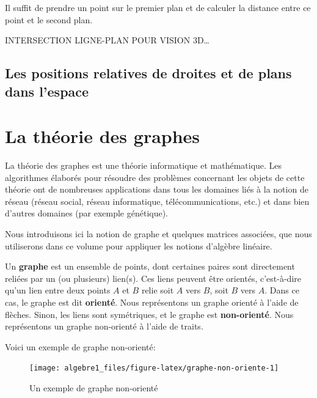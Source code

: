 \documentclass[]{book}
\theoremstyle{definition}
\theoremstyle{definition}
\theoremstyle{definition}
\theoremstyle{remark}
\let\BeginKnitrBlock\begin \let\EndKnitrBlock\end
\begin{document}
Il suffit de prendre un point sur le premier plan et de calculer la distance entre ce point et le second plan.

\BeginKnitrBlock{example}
\protect\hypertarget{exm:unnamed-chunk-237}{}{\label{exm:unnamed-chunk-237} }INTERSECTION LIGNE-PLAN POUR VISION 3D\ldots{}
\EndKnitrBlock{example}

\hypertarget{les-positions-relatives-de-droites-et-de-plans-dans-lespace}{%
\section{Les positions relatives de droites et de plans dans l'espace}\label{les-positions-relatives-de-droites-et-de-plans-dans-lespace}}

\hypertarget{appendix-appendices}{%
\appendix {}}


\hypertarget{graphes}{%
\chapter{La théorie des graphes}\label{graphes}}

La théorie des graphes est une théorie informatique et mathématique. Les algorithmes élaborés pour résoudre des problèmes concernant les objets de cette théorie ont de nombreuses applications dans tous les domaines liés à la notion de réseau (réseau social, réseau informatique, télécommunications, etc.) et dans bien d'autres domaines (par exemple génétique).

Nous introduisons ici la notion de graphe et quelques matrices associées, que nous utiliserons dans ce volume pour appliquer les notions d'algèbre linéaire.

\BeginKnitrBlock{definition}[Un graphe]
\protect\hypertarget{def:unnamed-chunk-238}{}{\label{def:unnamed-chunk-238} {} }Un \textbf{graphe} est un ensemble de points, dont certaines paires sont directement reliées par un (ou plusieurs) lien(s). Ces liens peuvent être orientés, c'est-à-dire qu'un lien entre deux points \(A\) et \(B\) relie soit \(A\) vers \(B\), soit \(B\) vers \(A\). Dans ce cas, le graphe est dit \textbf{orienté}. Nous représentons un graphe orienté à l'aide de flèches. Sinon, les liens sont symétriques, et le graphe est \textbf{non-orienté}. Nous représentons un graphe non-orienté à l'aide de traits.

Voici un exemple de graphe non-orienté:
\EndKnitrBlock{definition}

\begin{figure}

{\centering \texttt{[image: algebre1\_files/figure-latex/graphe-non-oriente-1]} 

}

\caption{Un exemple de graphe non-orienté}\label{fig:graphe-non-oriente}
\end{figure}
\end{document}
